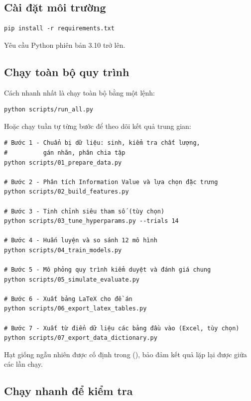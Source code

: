 \subsection{Cài đặt môi trường}

\begin{verbatim}
pip install -r requirements.txt
\end{verbatim}

Yêu cầu Python phiên bản 3.10 trở lên.

\subsection{Chạy toàn bộ quy trình}

Cách nhanh nhất là chạy toàn bộ bằng một lệnh:

\begin{verbatim}
python scripts/run_all.py
\end{verbatim}

Hoặc chạy tuần tự từng bước để theo dõi kết quả trung gian:

\begin{verbatim}
# Bước 1 - Chuẩn bị dữ liệu: sinh, kiểm tra chất lượng,
#          gán nhãn, phân chia tập
python scripts/01_prepare_data.py

# Bước 2 - Phân tích Information Value và lựa chọn đặc trưng
python scripts/02_build_features.py

# Bước 3 - Tinh chỉnh siêu tham số (tùy chọn)
python scripts/03_tune_hyperparams.py --trials 14

# Bước 4 - Huấn luyện và so sánh 12 mô hình
python scripts/04_train_models.py

# Bước 5 - Mô phỏng quy trình kiểm duyệt và đánh giá chung
python scripts/05_simulate_evaluate.py

# Bước 6 - Xuất bảng LaTeX cho đề án
python scripts/06_export_latex_tables.py

# Bước 7 - Xuất từ điển dữ liệu các bảng đầu vào (Excel, tùy chọn)
python scripts/07_export_data_dictionary.py
\end{verbatim}

Hạt giống ngẫu nhiên được cố định trong 
(), bảo đảm kết quả lặp lại được giữa các lần chạy.

\subsection{Chạy nhanh để kiểm tra}

